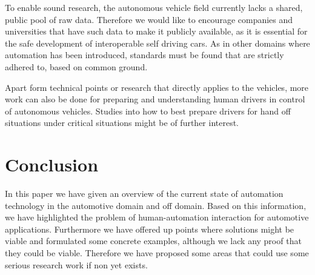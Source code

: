 \documentclass{acm_proc_article-sp}
\begin{document}
To enable sound research, the autonomous vehicle field currently lacks a shared, public pool of raw data.
Therefore we would like to encourage companies and universities that have such data to make it publicly available, as it is essential for the safe development of interoperable self driving cars.
As in other domains where automation has been introduced, standards must be found that are strictly adhered to, based on common ground.

Apart form technical points or research that directly applies to the vehicles, more work can also be done for preparing and understanding human drivers in control of autonomous vehicles.
Studies into how to best prepare drivers for hand off situations under critical situations might be of further interest.

\section{Conclusion}

In this paper we have given an overview of the current state of automation technology in the automotive domain and off domain.
Based on this information, we have highlighted the problem of human-automation interaction for automotive applications.
Furthermore we have offered up points where solutions might be viable and formulated some concrete examples, although we lack any proof that they could be viable.
Therefore we have proposed some areas that could use some serious research work if non yet exists.


  

\balancecolumns
\end{document}

